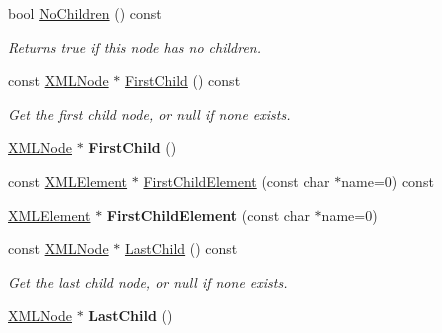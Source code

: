 \begin{DoxyCompactItemize}
\item 
bool \hyperlink{classtinyxml2_1_1_x_m_l_node_a96afe34a9ccd0ed4c0cff32beb42cc6c}{No\+Children} () const \hypertarget{classtinyxml2_1_1_x_m_l_node_a96afe34a9ccd0ed4c0cff32beb42cc6c}{}\label{classtinyxml2_1_1_x_m_l_node_a96afe34a9ccd0ed4c0cff32beb42cc6c}

\begin{DoxyCompactList}\small\item\em Returns true if this node has no children. \end{DoxyCompactList}\item 
const \hyperlink{classtinyxml2_1_1_x_m_l_node}{X\+M\+L\+Node} $\ast$ \hyperlink{classtinyxml2_1_1_x_m_l_node_a60e923d13d7dc01f45ab90a2f948b02a}{First\+Child} () const \hypertarget{classtinyxml2_1_1_x_m_l_node_a60e923d13d7dc01f45ab90a2f948b02a}{}\label{classtinyxml2_1_1_x_m_l_node_a60e923d13d7dc01f45ab90a2f948b02a}

\begin{DoxyCompactList}\small\item\em Get the first child node, or null if none exists. \end{DoxyCompactList}\item 
\hyperlink{classtinyxml2_1_1_x_m_l_node}{X\+M\+L\+Node} $\ast$ {\bfseries First\+Child} ()\hypertarget{classtinyxml2_1_1_x_m_l_node_a2d6c70c475146b48bc93a7fafdeff5e0}{}\label{classtinyxml2_1_1_x_m_l_node_a2d6c70c475146b48bc93a7fafdeff5e0}

\item 
const \hyperlink{classtinyxml2_1_1_x_m_l_element}{X\+M\+L\+Element} $\ast$ \hyperlink{classtinyxml2_1_1_x_m_l_node_a4a38e0da23f4d97673a86c77d5cae5c2}{First\+Child\+Element} (const char $\ast$name=0) const 
\item 
\hyperlink{classtinyxml2_1_1_x_m_l_element}{X\+M\+L\+Element} $\ast$ {\bfseries First\+Child\+Element} (const char $\ast$name=0)\hypertarget{classtinyxml2_1_1_x_m_l_node_af1e0e475cc27d5e7eeaf4d732691b741}{}\label{classtinyxml2_1_1_x_m_l_node_af1e0e475cc27d5e7eeaf4d732691b741}

\item 
const \hyperlink{classtinyxml2_1_1_x_m_l_node}{X\+M\+L\+Node} $\ast$ \hyperlink{classtinyxml2_1_1_x_m_l_node_a6088246532b02895beb0e6fa561a7f3b}{Last\+Child} () const \hypertarget{classtinyxml2_1_1_x_m_l_node_a6088246532b02895beb0e6fa561a7f3b}{}\label{classtinyxml2_1_1_x_m_l_node_a6088246532b02895beb0e6fa561a7f3b}

\begin{DoxyCompactList}\small\item\em Get the last child node, or null if none exists. \end{DoxyCompactList}\item 
\hyperlink{classtinyxml2_1_1_x_m_l_node}{X\+M\+L\+Node} $\ast$ {\bfseries Last\+Child} ()\hypertarget{classtinyxml2_1_1_x_m_l_node_ad7552c8cb1dc0cb6f3bdc14a9d115dbf}{}\label{classtinyxml2_1_1_x_m_l_node_ad7552c8cb1dc0cb6f3bdc14a9d115dbf}


\end{DoxyCompactItemize}
